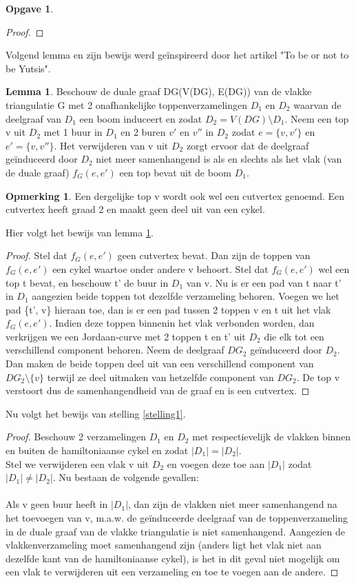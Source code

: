 \documentclass[11pt, a4paper, table]{article}
\theoremstyle{definition}
\newtheorem{opgave}{Opgave}
\theoremstyle{definition}
\theoremstyle{definition}
\newtheorem{opmerking}{Opmerking}
\newtheorem{lemma}{Lemma}
\begin{document}
\begin{opgave}
\begin{proof}
	\end{proof}
	Volgend lemma en zijn bewijs werd ge\"{i}nspireerd door het artikel "To be or not to be Yutsis". 
	\begin{lemma} 
		\label{lemma2}
		Beschouw de duale graaf DG(V(DG), E(DG)) van de vlakke triangulatie G met 2 onafhankelijke toppenverzamelingen $D_1$ en $D_2$ waarvan de deelgraaf van $D_1$ een boom induceert en zodat $D_2 = V(DG) \setminus D_1$. Neem een top v uit $D_2$ met 1 buur in $D_1$ en 2 buren $v'$ en $v''$ in $D_2$ zodat $e = \{v, v'\}$ en $e' = \{v, v''\}$. Het verwijderen van v uit $D_2$ zorgt ervoor dat de deelgraaf ge\"{i}nduceerd door $D_2$ niet meer samenhangend is als en slechts als het vlak (van de duale graaf) $f_G(e,e')$ een top bevat uit de boom $D_1$.
	\end{lemma}
	\begin{opmerking}
		Een dergelijke top v wordt ook wel een cutvertex genoemd. Een cutvertex heeft graad 2 en maakt geen deel uit van een cykel. 
	\end{opmerking}
	Hier volgt het bewijs van lemma \ref{lemma2}. 
	\begin{proof}
		Stel dat $f_G(e,e')$ geen cutvertex bevat. Dan zijn de toppen van $f_G(e,e')$ een cykel waartoe onder andere v behoort. 
		Stel dat $f_G(e,e')$ wel een top t bevat, en beschouw t' de buur in $D_1$ van v. Nu is er een pad van t naar t' in $D_1$ aangezien beide toppen tot dezelfde verzameling behoren. Voegen we het pad \{t', v\} hieraan toe, dan is er een pad tussen 2 toppen v en t uit het vlak $f_G(e,e')$. Indien deze toppen binnenin het vlak verbonden worden, dan verkrijgen we een Jordaan-curve met 2 toppen t en t' uit $D_2$ die elk tot een verschillend component behoren. Neem de deelgraaf $DG_2$ ge\"{i}nduceerd door $D_2$. Dan maken de beide toppen deel uit van een verschillend component van $DG_2 \setminus \{v\}$ terwijl ze deel uitmaken van hetzelfde component van $DG_2$. De top v verstoort dus de samenhangendheid van de graaf en is een cutvertex. 
	\end{proof}
	Nu volgt het bewijs van stelling \ref{stelling1}.
	\begin{proof}
		Beschouw 2 verzamelingen $D_1$ en $D_2$ met respectievelijk de vlakken binnen en buiten de hamiltoniaanse cykel en zodat $|D_1| = |D_2|$. 
		\\Stel we verwijderen een vlak v uit $D_2$ en voegen deze toe aan $|D_1|$ zodat $|D_1| \neq |D_2|$. 
		Nu bestaan de volgende gevallen: 
		\\\\Als v geen buur heeft in $|D_1|$, dan zijn de vlakken niet meer samenhangend na het toevoegen van v, m.a.w. de ge\"{i}nduceerde deelgraaf van de toppenverzameling in de duale graaf van de vlakke triangulatie is niet samenhangend. Aangezien de vlakkenverzameling moet samenhangend zijn (anders ligt het vlak niet aan dezelfde kant van de hamiltoniaanse cykel), is het in dit geval niet mogelijk om een vlak te verwijderen uit een verzameling en toe te voegen aan de andere. 

\end{proof}
\end{opgave}
\end{document}
